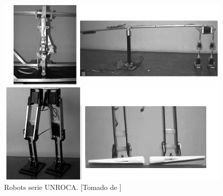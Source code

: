 \begin{figure}[!hbt]
  \centering
  \includegraphics[scale=0.4]{../images/unroca.png}
  \caption{Robots serie UNROCA. [Tomado de \cite{M2005}]}
  \label{fig:unroca}
\end{figure}


